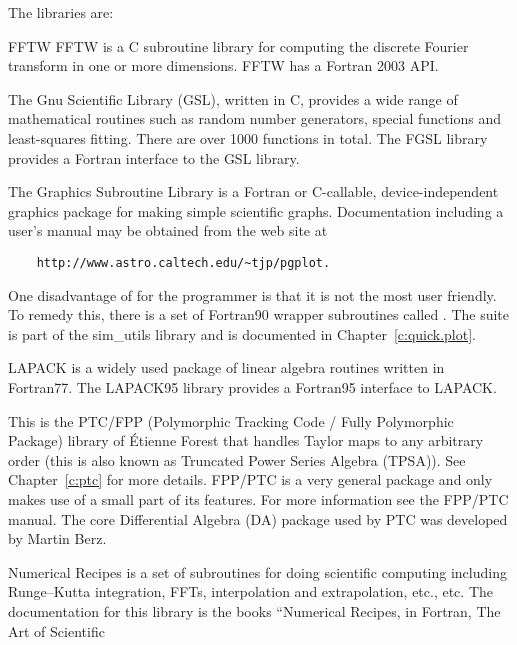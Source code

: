 The  libraries are:
\begin{description}
  \item{FFTW}
FFTW is a C subroutine library for computing the discrete Fourier
transform in one or more dimensions. FFTW has a Fortran 2003 API.
  \item[GSL / FGSL]
The Gnu Scientific Library (GSL), written in C,
provides a wide range of mathematical routines
such as random number generators, special functions and least-squares
fitting. There are over 1000 functions in total. The FGSL library provides a Fortran
interface to the GSL library.
  \item[pgplot] 
The  Graphics Subroutine Library is a Fortran or
C-callable, device-independent graphics package for making simple
scientific graphs. Documentation including a user's manual may be
obtained from the  web site at
\begin{verbatim}
    http://www.astro.caltech.edu/~tjp/pgplot.
\end{verbatim} 
One disadvantage of  for the programmer is that it is not the
most user friendly. To remedy this, there is a set of Fortran90
wrapper subroutines called .  The 
suite is part of the sim_utils library and is documented in
Chapter~\ref{c:quick.plot}.
  \item[LAPACK / LAPACK95]
LAPACK is a widely used package of linear algebra routines written in
Fortran77.  The LAPACK95 library provides a Fortran95 interface to
LAPACK.
  \item[forest] 
This is the PTC/FPP (Polymorphic Tracking Code / Fully Polymorphic
Package) library of \'Etienne Forest that handles Taylor maps to any
arbitrary order (this is also known as Truncated Power Series Algebra
(TPSA)). See Chapter~\ref{c:ptc} for more details.  FPP/PTC is a
very general package and \bmad only makes use of a small part of its
features.  For more information see the FPP/PTC
manual\cite{b:ptc}. The core Differential Algebra (DA) package used
by PTC was developed by Martin Berz\cite{b:berz}.
  \item[recipes] 
Numerical Recipes is a set of subroutines for doing scientific
computing including Runge--Kutta integration, FFTs, interpolation and
extrapolation, etc., etc. The documentation for this library is the
books ``Numerical Recipes, in Fortran, The Art of Scientific

\end{description}
